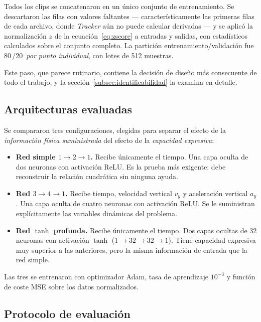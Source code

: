 \documentclass[titlepage,11pt]{article}
\providecommand{\SI}[2]{#1\,#2}
\providecommand{\percent}{\char37\relax}
\begin{document}
Todos los clips se concatenaron en un único conjunto de entrenamiento. Se
descartaron las filas con valores faltantes --- característicamente las
primeras filas de cada archivo, donde \emph{Tracker} aún no puede calcular
derivadas --- y se aplicó la normalización $z$ de la
ecuación~\eqref{eq:zscore} a entradas y salidas, con estadísticos calculados
sobre el conjunto completo. La partición entrenamiento/validación fue
\SI{80}{\percent}/\SI{20}{\percent} \emph{por punto individual}, con lotes de
512 muestras.

Este paso, que parece rutinario, contiene la decisión de diseño más
consecuente de todo el trabajo, y la sección~\ref{subsec:identificabilidad} la
examina en detalle.

\subsection{Arquitecturas evaluadas}
\label{subsec:arquitecturas}

Se compararon tres configuraciones, elegidas para separar el efecto de la
\emph{información física suministrada} del efecto de la \emph{capacidad
expresiva}:

\begin{itemize}
\item \textbf{Red simple $1\to2\to1$.} Recibe únicamente el tiempo. Una capa
  oculta de dos neuronas con activación ReLU. Es la prueba más exigente: debe
  reconstruir la relación cuadrática sin ninguna ayuda.
\item \textbf{Red $3\to4\to1$.} Recibe tiempo, velocidad vertical $v_y$ y
  aceleración vertical $a_y$. Una capa oculta de cuatro neuronas con activación
  ReLU. Se le suministran explícitamente las variables dinámicas del problema.
\item \textbf{Red $\tanh$ profunda.} Recibe únicamente el tiempo. Dos capas
  ocultas de 32 neuronas con activación $\tanh$ ($1\to32\to32\to1$). Tiene
  capacidad expresiva muy superior a las anteriores, pero la misma información
  de entrada que la red simple.
\end{itemize}

Las tres se entrenaron con optimizador Adam, tasa de aprendizaje $10^{-3}$ y
función de coste MSE sobre los datos normalizados.

\subsection{Protocolo de evaluación}
\label{sec:protocolo}
\end{document}

